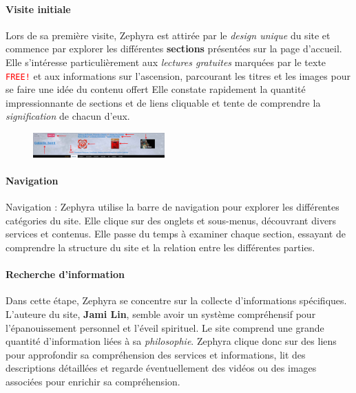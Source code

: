 \documentclass[9pt]{report}
\begin{document}
\begin{multicols*}{2}
  \paragraph{Visite initiale}
  Lors de sa première visite, Zephyra est attirée par le 
  \textit{design unique} du 
  site et commence par explorer les différentes \textbf{sections}
  présentées sur la page d'accueil. Elle s'intéresse particulièrement 
  aux \textit{lectures gratuites} marquées par le texte 
  \textcolor{red}{\texttt{FREE!}} et aux informations sur l'ascension, 
  parcourant les titres et les images pour se faire une idée 
  du contenu offert Elle constate rapidement la quantité impressionnante 
  de sections et de liens cliquable et tente de comprendre 
  la \textit{signification} de chacun d'eux.


  \begin{figure}[H]
    \begin{center}
      \includegraphics[width=0.45\textwidth]{NavigationInitialeNavbar.png}
    \end{center}
  \end{figure}


  \paragraph{Navigation}
  Navigation : Zephyra utilise la barre de navigation pour explorer 
  les différentes catégories du site. Elle clique sur des onglets et 
  sous-menus, découvrant divers services et contenus. 
  Elle passe du temps à examiner chaque section, essayant de 
  comprendre la structure du site et la relation entre les différentes 
  parties.

  \paragraph{Recherche d'information}
  Dans cette étape, 
  Zephyra se concentre sur la collecte d'informations spécifiques. 
  L'auteure du site, \textbf{Jami Lin}, semble avoir un système  
  compréhensif pour l'épanouissement personnel et l'éveil spirituel. 
  Le site comprend une grande quantité d'information liées à 
  sa \textit{philosophie}. 
  Zephyra clique donc sur des liens pour approfondir sa compréhension des 
  services et  informations, 
  lit des descriptions détaillées et regarde 
  éventuellement des vidéos ou des images associées pour enrichir 
  sa compréhension.


\end{multicols*}
\end{document}
